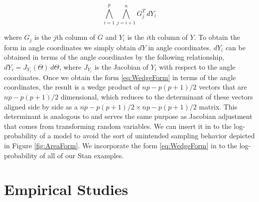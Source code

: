 \documentclass{article}
\begin{document}
\begin{equation}
\label{eq:WedgeForm}
\bigwedge_{i=1}^p \bigwedge_{j=i+1}^n G_j^T\, dY_i
\end{equation}

where $G_j$ is the $j$th column of $G$ and $Y_i$ is the $i$th column of $Y$. To obtain the form in angle coordinates we simply obtain $dY$ in angle coordinates. $dY_i$ can be obtained in terms of the angle coordinates by the following relationship, $dY_i = J_{Y_i}(\Theta)\, d\Theta$, where $J_{Y_i}$ is the Jacobian of $Y_i$ with respect to the angle coordinates. Once we obtain the form \ref{eq:WedgeForm} in terms of the angle coordinates, the result is a wedge product of $np-p(p+1)/2$ vectors that are $np-p(p+1)/2$ dimensional, which reduces to the determinant of these vectors aligned side by side as a $np-p(p+1)/2 \times np-p(p+1)/2$ matrix. This determinant is analogous to and serves the same purpose as Jacobian adjustment that comes from transforming random variables. We can insert it in to the log-probability of a model to avoid the sort of unintended sampling behavior depicted in Figure \ref{fig:AreaForm}. We incorporate the form \ref{eq:WedgeForm} in to the log-probability of all of our Stan examples.

\section{Empirical Studies} \label{examples}

\end{document}
